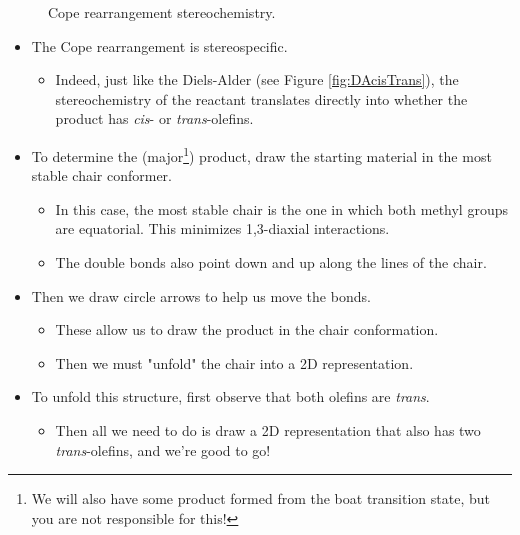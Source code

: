 \documentclass[../notes.tex]{subfiles}
\begin{document}
\begin{itemize}
\begin{figure}[h!]
            \arrow
            \arrow{0[\small $\equiv$][][-2mm]}
        \schemestop
        \caption{Cope rearrangement stereochemistry.}
        \label{fig:Copestereochem}
    \end{figure}
    \begin{itemize}
        \item The Cope rearrangement is stereospecific.
        \begin{itemize}
            \item Indeed, just like the Diels-Alder (see Figure \ref{fig:DAcisTrans}), the stereochemistry of the reactant translates directly into whether the product has \emph{cis}- or \emph{trans}-olefins.
        \end{itemize}
        \item To determine the (major\footnote{We will also have some product formed from the boat transition state, but you are not responsible for this!}) product, draw the starting material in the most stable chair conformer.
        \begin{itemize}
            \item In this case, the most stable chair is the one in which both methyl groups are equatorial. This minimizes 1,3-diaxial interactions.
            \item The double bonds also point down and up along the lines of the chair.
        \end{itemize}
        \item Then we draw circle arrows to help us move the bonds.
        \begin{itemize}
            \item These allow us to draw the product in the chair conformation.
            \item Then we must "unfold" the chair into a 2D representation.
        \end{itemize}
        \item To unfold this structure, first observe that both olefins are \emph{trans}.
        \begin{itemize}
            \item Then all we need to do is draw a 2D representation that also has two \emph{trans}-olefins, and we're good to go!

\end{itemize}
\end{itemize}
\end{itemize}
\end{document}
